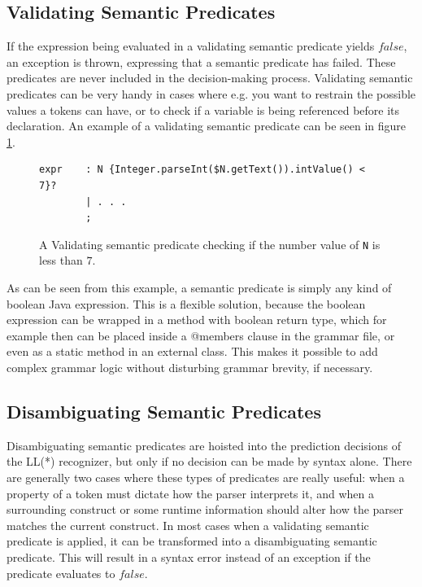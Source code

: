 \subsection{Validating Semantic Predicates}
\label{sect:antlr:val_semantic_preds}
If the expression being evaluated in a validating semantic predicate yields $false$, an exception is thrown, expressing that a semantic predicate has failed. These predicates are never included in the decision-making process. Validating semantic predicates can be very handy in cases where e.g. you want to restrain the possible values a tokens can have, or to check if a variable is being referenced before its declaration. An example of a validating semantic predicate can be seen in figure \ref{code:validateSemantic}.

\begin{figure}[h!]
\begin{verbatim}
expr    : N {Integer.parseInt($N.getText()).intValue() < 7}?
        | . . .
        ;
\end{verbatim}
\caption[Validating semantic predicate.]{A Validating semantic predicate checking if the number value of \texttt{N} is less than $7$.}
\label{code:validateSemantic}
\end{figure}
As can be seen from this example, a semantic predicate is simply any kind of boolean Java expression. This is a flexible solution, because the boolean expression can be wrapped in a method with boolean return type, which for example then can be placed inside a @members { } clause in the grammar file, or even as a static method in an external class. This makes it possible to add complex grammar logic without
disturbing grammar brevity, if necessary.

\subsection{Disambiguating Semantic Predicates}
\label{sect:antlr:disambiguatingSemantic}
Disambiguating semantic predicates are hoisted into the prediction decisions of the LL(*) recognizer, but only if no decision can be made by syntax alone. There are generally two cases where these types of predicates are really useful: when a property of a token must dictate how the parser interprets it, and when a surrounding construct or some runtime information should alter how the parser matches the current construct. In most cases when a validating semantic predicate is applied, it can be transformed into a disambiguating semantic predicate. This will result in a syntax error instead of an exception if the predicate evaluates to $false$.

